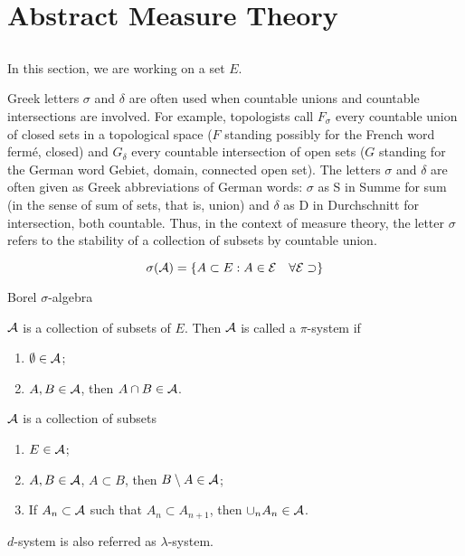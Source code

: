 \chapter{Abstract Measure Theory}


\section{}
In this section, we are working on a set $E$.

\begin{definition}
    
\end{definition}
\begin{remark}
    Greek letters $\sigma$ and $\delta$ are often used when countable unions and countable intersections are involved. 
    For example, topologists call $F_\sigma$ every countable union of closed sets in a topological space ($F$ standing possibly for the French word fermé, closed) and $G_\delta$
 every countable intersection of open sets ($G$ standing for the German word Gebiet, domain, connected open set). 
 The letters $\sigma$
 and $\delta$
 are often given as Greek abbreviations of German words: $\sigma$
 as S in Summe for sum (in the sense of sum of sets, that is, union) and $\delta$
 as D in Durchschnitt for intersection, both countable. 
 Thus, in the context of measure theory, the letter $\sigma$ refers to the stability of a collection of subsets by countable union.
\end{remark}

\begin{definition}
    \[\sigma(\mathcal{A})=\{A\subset E:A\in\mathcal{E} \quad \forall \mathcal{E} \supset \}\]
\end{definition}

\begin{example}
    Borel $\sigma$-algebra
\end{example}

\begin{definition}[$\pi$-system]
    $\mathcal{A}$ is a collection of subsets of $E$. Then $\mathcal{A}$ is called a $\pi$-system if 
    \begin{enumerate}
        \item $\emptyset\in\mathcal{A}$;
        \item $A,B\in\mathcal{A}$, then $A\cap B\in\mathcal{A}$.
    \end{enumerate}
\end{definition}

\begin{definition}[$d$-system]
    $\mathcal{A}$ is a collection of subsets 
    \begin{enumerate}
        \item $E\in\mathcal{A}$;
        \item $A,B\in\mathcal{A}$, $A\subset B$, then $B\setminus A \in\mathcal{A}$;
        \item If $A_n\subset \mathcal{A}$ such that $A_n\subset A_{n+1}$, then $\cup_{n}A_n\in\mathcal{A}$.
    \end{enumerate}
\end{definition}
\begin{remark}
    $d$-system is also referred as $\lambda$-system.
\end{remark}

